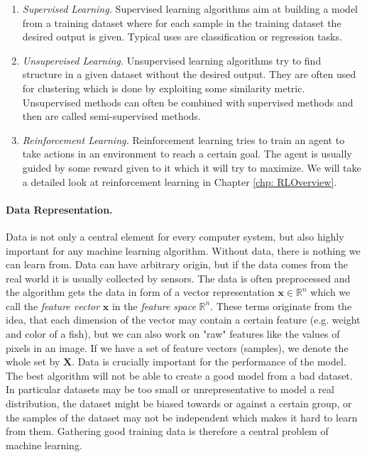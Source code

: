 \begin{enumerate}
  \item \textit{Supervised Learning.} Supervised learning algorithms aim at building a model from a training dataset where for each sample in the training dataset the desired output is given. Typical uses are classification or regression tasks.
  \item \textit{Unsupervised Learning.} Unsupervised learning algorithms try to find structure in a given dataset without the desired output. They are often used for clustering which is done by exploiting some similarity metric. Unsupervised methods can often be combined with supervised methods and then are called semi-supervised methods.
  \item \textit{Reinforcement Learning.} Reinforcement learning tries to train an agent to take actions in an environment to reach a certain goal. The agent is usually guided by some reward given to it which it will try to maximize. We will take a detailed look at reinforcement learning in Chapter \ref{chp: RLOverview}.
\end{enumerate}

\paragraph{Data Representation.} Data is not only a central element for every computer system, but also highly important for any machine learning algorithm. Without data, there is nothing we can learn from. Data can have arbitrary origin, but if the data comes from the real world it is usually collected by sensors. The data is often preprocessed and the algorithm gets the data in form of a vector representation $\mathbf{x} \in \mathbb{R}^n$ which we call the \textit{feature vector} $\mathbf{x}$ in the \textit{feature space} $\mathbb{R}^n$. These terms originate from the idea, that each dimension of the vector may contain a certain feature (e.g. weight and color of a fish), but we can also work on "raw" features like the values of pixels in an image. If we have a set of feature vectors (samples), we denote the whole set by $\mathbf{X}$. Data is crucially important for the performance of the model. The best algorithm will not be able to create a good model from a bad dataset. In particular datasets may be too small or unrepresentative to model a real distribution, the dataset might be biased towards or against a certain group, or the samples of the dataset may not be independent which makes it hard to learn from them. Gathering good training data is therefore a central problem of machine learning.

